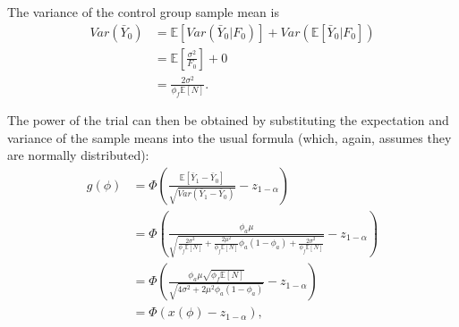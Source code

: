\documentclass{article}
\begin{document}
The variance of the control group sample mean is
\begin{align*}
Var(\bar{Y}_0) &= \mathbb{E}[Var(\bar{Y}_0 | F_0)] + Var(\mathbb{E}[\bar{Y}_0 | F_0]) \\
&= \mathbb{E} \left[ \frac{\sigma^2}{F_0} \right] + 0\\
&= \frac{2\sigma^2}{\phi_f \mathbb{E}[N]}.
\end{align*}

The power of the trial can then be obtained by substituting the expectation and variance of the sample means into the usual formula (which, again, assumes they are normally distributed):
\begin{align*}
g(\phi) &= \Phi \left(\frac{\mathbb{E}[\bar{Y}_1 - \bar{Y}_0]}{\sqrt{Var(\bar{Y}_1 - \bar{Y}_0)}} - z_{1-\alpha} \right) \\
&= \Phi \left( \frac{\phi_a\mu}{\sqrt{ \frac{2\sigma^2}{\phi_f \mathbb{E}[N]} + \frac{2\mu^2}{\phi_f \mathbb{E}[N]} \phi_a (1-\phi_a) + \frac{2\sigma^2}{\phi_f \mathbb{E}[N]}} } - z_{1-\alpha} \right) \\
&= \Phi \left( \frac{ \phi_a\mu \sqrt{\phi_f \mathbb{E}[N]} } {\sqrt{4\sigma^2 + 2\mu^2 \phi_a(1-\phi_a)}} - z_{1-\alpha} \right) \\
&= \Phi \left( x(\phi) - z_{1-\alpha} \right),
\end{align*}
\end{document}
